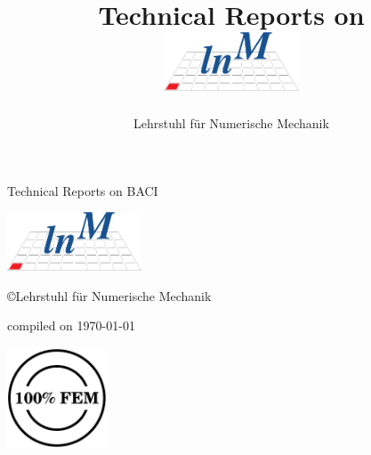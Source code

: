 \documentclass[a4paper,10pt]{book}
\title{Technical Reports on \baci{}\\
\vspace{2cm}
\includegraphics[width=0.3\textwidth]{templates/gfx/lnm-notext}
}
\author{Lehrstuhl f\"{u}r Numerische Mechanik}
\newcommand{\baci}{\textsc{BACI}}
\begin{document}
\bibliographyunit[\chapter]
%


\frontmatter

\begin{titlepage}
\vspace{5cm}
\begin{center}
\huge{Technical Reports on \baci{}}

\vspace{2cm}

\includegraphics[width=0.3\textwidth]{templates/gfx/lnm-notext}

\vspace{2cm}

\copyright{}Lehrstuhl f\"{u}r Numerische Mechanik

\vspace{2cm}

\small{compiled on \today}

\vspace{10cm}
\begin{flushright}
\includegraphics[width=3cm,angle=7]{templates/gfx/hundredpercentfem}
\end{flushright}

\end{center}
\end{titlepage}

\tableofcontents

\mainmatter

\newpage
\end{document}
